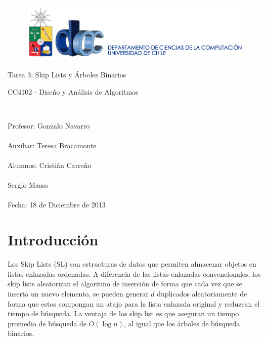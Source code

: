 \documentclass[12pt,letterpaper]{article}
\begin{document}
\begin{titlepage}
\begin{figure}[ht]
\includegraphics[scale=1]{logo_departamento.eps}
\label{DCC}
\vspace{1cm}
\end{figure}
\begin{center}
\vspace{4cm} {\Huge Tarea 3: Skip Lists y Árboles Binarios}

\vspace{1cm} {\Large CC4102 - Diseño y Análisis de Algoritmos}
\vspace{7.5cm}
\end{center}

\begin{tabbing}
\hspace*{7cm}\=\hspace*{3.5cm}\= \kill

\> {\large Profesor:} 	\> 	{\large Gonzalo Navarro} \\ \\
\> {\large Auxiliar:}	\> 	{\large Teresa Bracamonte} \\ \\
\> {\large Alumnos:}	\> 	{\large Cristián Carreño} \\ \\
\> {\large } 			\> 	{\large Sergio Maass} \\ \\
\> {\large Fecha:} 		\> 	{\large 18 de Diciembre de 2013}
\end{tabbing}

\end{titlepage}

\tableofcontents
\newpage

\section{Introducción}
Los Skip Lists (SL) son estructuras de datos que permiten almacenar objetos en listas enlazadas ordenadas. A diferencia de las listas enlazadas convencionales, los skip lists aleatorizan el algoritmo de inserción de forma que cada vez que se inserta un nuevo elemento, se pueden generar $d$ duplicados aleatoriamente de forma que estos compongan un atajo para la lista enlazada original y reduzcan el tiempo de búsqueda. La ventaja de los skip list es que aseguran un tiempo promedio de búsqueda de $O(\log{n})$, al igual que los árboles de búsqueda binarios.\\
\end{document}
